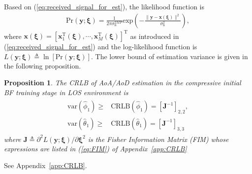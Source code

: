 \documentclass[journal]{IEEEtran}
\newtheorem{proposition}{Proposition}
\newcommand{\hermitian}[0]{\text{H}}
\newcommand{\transpose}[0]{\text{T}}
\newcommand{\sigman}[0]{\sigma_{\text{n}}}
\newcommand{\prob}[0]{\mathrm{Pr}}
\begin{document}
Based on (\ref{eq:received_signal_for_est}), the likelihood function is 
\begin{align}
\prob(\mathbf{y};\boldsymbol{\xi}) = \frac{1}{2\pi\sigman^{2MP}}\text{exp}\left(-\frac{\|\mathbf{y}-\mathbf{x}(\boldsymbol{\xi})\|^2}{\sigman^2}\right),
\end{align}
where $\mathbf{x}(\boldsymbol{\xi}) = [\mathbf{x}^\transpose_1(\boldsymbol{\xi}),\cdots, \mathbf{x}^\transpose_M(\boldsymbol{\xi})]^\transpose$ as introduced in (\ref{eq:received_signal_for_est}) and the log-likelihood function is $L(\mathbf{y};\boldsymbol{\xi}) \triangleq \ln [\prob(\mathbf{y};\boldsymbol{\xi})]$. The lower bound of estimation variance is given in the following proposition.


\begin{proposition}
\label{proposition:CRLB}
 The CRLB of AoA/AoD estimation in the compressive initial BF training stage in LOS environment is 
 \begin{align}
 \begin{split}
 \mathrm{var}(\hat{\phi}_1) \geq &\mathrm{CRLB}(\hat{\phi}_1) = [\mathbf{J}^{-1}]_{2,2},\\
 \mathrm{var}(\hat{\theta}_1) \geq &\mathrm{CRLB}(\hat{\theta}_1) = [\mathbf{J}^{-1}]_{3,3}
 \end{split}
 \end{align}
 where $\mathbf{J}\triangleq \partial^2 L(\mathbf{y};\boldsymbol{\xi})/\partial\boldsymbol{\xi}^2$ is the Fisher Information Matrix (FIM) whose expressions are listed in (\ref{eq:FIM}) of Appendix~\ref{app:CRLB}
\end{proposition}
\begin{IEEEproof}
See Appendix~\ref{app:CRLB}.
\end{IEEEproof}
\end{document}
